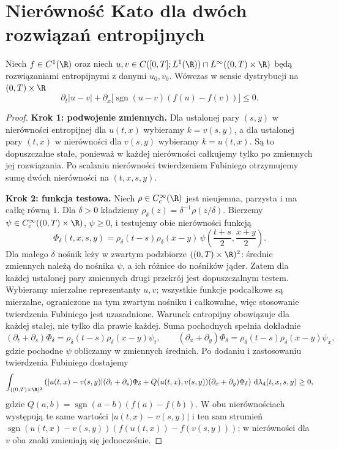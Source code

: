 \section{Nierówność Kato dla dwóch rozwiązań entropijnych}
\begin{twierdzenie}
\label{thm:pde24-kato}
Niech $f\in C^1(\R)$ oraz niech
$u,v\in C([0,T];L^1(\R))\cap L^\infty((0,T)\times\R)$
będą rozwiązaniami entropijnymi z danymi $u_0,v_0$.
Wówczas w sensie dystrybucji na $(0,T)\times\R$
\begin{equation}\label{eq:pde24-kato}
 \partial_t|u-v|+\partial_x\bigl[
 \operatorname{sgn}(u-v)(f(u)-f(v))\bigr]\le0.
\end{equation}
\end{twierdzenie}
\begin{proof}
\textbf{Krok 1: podwojenie zmiennych.}
Dla ustalonej pary $(s,y)$ w nierówności entropijnej
dla $u(t,x)$ wybieramy $k=v(s,y)$, a dla ustalonej pary
$(t,x)$ w nierówności dla $v(s,y)$ wybieramy $k=u(t,x)$.
Są to dopuszczalne stałe, ponieważ w każdej nierówności
całkujemy tylko po zmiennych jej rozwiązania. Po
scalaniu nierówności twierdzeniem Fubiniego otrzymujemy
sumę dwóch nierówności na $(t,x,s,y)$.

\textbf{Krok 2: funkcja testowa.}
Niech $\rho\in C_c^\infty(\R)$ jest nieujemna, parzysta
i ma całkę równą $1$. Dla $\delta>0$ kładziemy
$\rho_\delta(z)=\delta^{-1}\rho(z/\delta)$.
Bierzemy $\psi\in C_c^\infty((0,T)\times\R)$, $\psi\ge0$,
i testujemy obie nierówności funkcją
\[
 \Phi_\delta(t,x,s,y)=
 \rho_\delta(t-s)\rho_\delta(x-y)\,
 \psi\!\left(\frac{t+s}{2},\frac{x+y}{2}\right).
\]
Dla małego $\delta$ nośnik leży w zwartym podzbiorze
$((0,T)\times\R)^2$: średnie zmiennych należą do
nośnika $\psi$, a ich różnice do nośników jąder.
Zatem dla każdej ustalonej pary zmiennych drugi
przekrój jest dopuszczalnym testem. Wybieramy mierzalne
reprezentanty $u,v$; wszystkie funkcje podcałkowe są
mierzalne, ograniczone na tym zwartym nośniku
i całkowalne, więc stosowanie twierdzenia Fubiniego
jest uzasadnione. Warunek entropijny obowiązuje dla
każdej stałej, nie tylko dla prawie każdej.
Suma pochodnych spełnia dokładnie
\[
 (\partial_t+\partial_s)\Phi_\delta
 =\rho_\delta(t-s)\rho_\delta(x-y)\psi_t,
 \qquad
 (\partial_x+\partial_y)\Phi_\delta
 =\rho_\delta(t-s)\rho_\delta(x-y)\psi_x,
\]
gdzie pochodne $\psi$ obliczamy w zmiennych średnich.
Po dodaniu i zastosowaniu twierdzenia Fubiniego dostajemy
\[
 \int_{((0,T)\times\R)^2}
 \left(
 |u(t,x)-v(s,y)|(\partial_t+\partial_s)\Phi_\delta
 +Q(u(t,x),v(s,y))(\partial_x+\partial_y)\Phi_\delta
 \right)
 \,\mathrm d\lambda_4(t,x,s,y)\ge0,
\]
gdzie $Q(a,b)=\operatorname{sgn}(a-b)(f(a)-f(b))$.
W obu nierównościach występują te same wartości
$|u(t,x)-v(s,y)|$ i ten sam strumień
$\operatorname{sgn}(u(t,x)-v(s,y))
(f(u(t,x))-f(v(s,y)))$; w nierówności dla $v$
oba znaki zmieniają się jednocześnie.


\end{proof}
